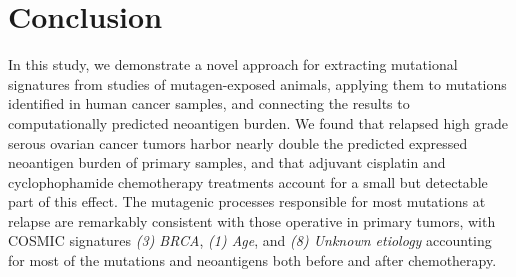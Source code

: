 \section*{Conclusion}
In this study, we demonstrate a novel approach for extracting mutational signatures from studies of mutagen-exposed animals, applying them to mutations identified in human cancer samples, and connecting the results to computationally predicted neoantigen burden. We found that relapsed high grade serous ovarian cancer tumors harbor nearly double the predicted expressed neoantigen burden of primary samples, and that adjuvant cisplatin and cyclophophamide chemotherapy treatments account for a small but detectable part of this effect. The mutagenic processes responsible for most mutations at relapse are remarkably consistent with those operative in primary tumors, with COSMIC signatures \textit{(3) BRCA}, \textit{(1) Age}, and \textit{(8) Unknown etiology} accounting for most of the mutations and neoantigens both before and after chemotherapy.